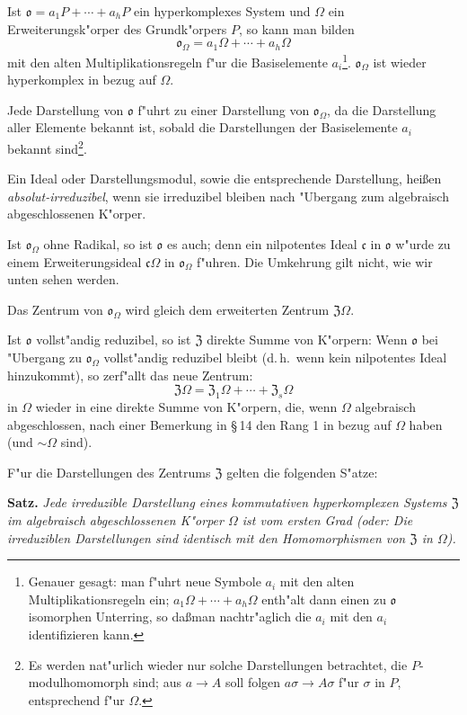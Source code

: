 \documentclass[12pt,a4paper]{article}
\theoremstyle{plain}
\begin{document}
\smallskip

\noindent
Ist $\mathfrak{o} = a_1P + \cdots + a_hP$ ein hyperkomplexes System und $\Omega$ ein Erweiterungsk"orper des Grundk"orpers $P$, so kann man bilden
\[
\mathfrak{o}_\Omega = a_1\Omega + \cdots + a_h\Omega
\]
mit den alten Multiplikationsregeln f"ur die Basiselemente $a_i$\footnote{Genauer gesagt: man f"uhrt neue Symbole $a_i$ mit den alten Multiplikationsregeln ein; $a_1\Omega + \cdots + a_h\Omega$ enth"alt dann einen zu $\mathfrak{o}$ isomorphen Unterring, so da\ss man nachtr"aglich die $a_i$ mit den $a_i$ identifizieren kann.}. $\mathfrak{o}_\Omega$ ist wieder hyperkomplex in bezug auf $\Omega$.

Jede Darstellung von $\mathfrak{o}$ f"uhrt zu einer Darstellung von $\mathfrak{o}_\Omega$, da die Darstellung aller Elemente bekannt ist, sobald die Darstellungen der Basiselemente $a_i$ bekannt sind\footnote{Es werden nat"urlich wieder nur solche Darstellungen betrachtet, die $P$-modulhomomorph sind; aus $a \to A$ soll folgen $a\sigma \to A\sigma$ f"ur $\sigma$ in $P$, entsprechend f"ur $\Omega$.}.

Ein Ideal oder Darstellungsmodul, sowie die entsprechende Darstellung, hei\ss en \textit{absolut-irreduzibel}, wenn sie irreduzibel bleiben nach "Ubergang zum algebraisch abgeschlossenen K"orper.

Ist $\mathfrak{o}_\Omega$ ohne Radikal, so ist $\mathfrak{o}$ es auch; denn ein nilpotentes Ideal $\mathfrak{c}$ in $\mathfrak{o}$ w"urde zu einem Erweiterungsideal $\mathfrak{c}\Omega$ in $\mathfrak{o}_\Omega$ f"uhren. Die Umkehrung gilt nicht, wie wir unten sehen werden.

Das Zentrum von $\mathfrak{o}_\Omega$ wird gleich dem erweiterten Zentrum $\mathfrak{Z}\Omega$.

Ist $\mathfrak{o}$ vollst"andig reduzibel, so ist $\mathfrak{Z}$ direkte Summe von K"orpern: Wenn $\mathfrak{o}$ bei "Ubergang zu $\mathfrak{o}_\Omega$ vollst"andig reduzibel bleibt (d.\,h.\ wenn kein nilpotentes Ideal hinzukommt), so zerf"allt das neue Zentrum:
\[
\mathfrak{Z}\Omega = \mathfrak{Z}_1\Omega + \cdots + \mathfrak{Z}_s\Omega
\]
in $\Omega$ wieder in eine direkte Summe von K"orpern, die, wenn $\Omega$ algebraisch abgeschlossen, nach einer Bemerkung in \S\,14 den Rang 1 in bezug auf $\Omega$ haben (und $\sim \Omega$ sind).

F"ur die Darstellungen des Zentrums $\mathfrak{Z}$ gelten die folgenden S"atze:

\medskip\noindent\textbf{Satz.}
\textit{Jede irreduzible Darstellung eines kommutativen hyperkomplexen Systems $\mathfrak{Z}$ im algebraisch abgeschlossenen K"orper $\Omega$ ist vom ersten Grad (oder: Die irreduziblen Darstellungen sind identisch mit den Homomorphismen von $\mathfrak{Z}$ in $\Omega$).}
\end{document}
